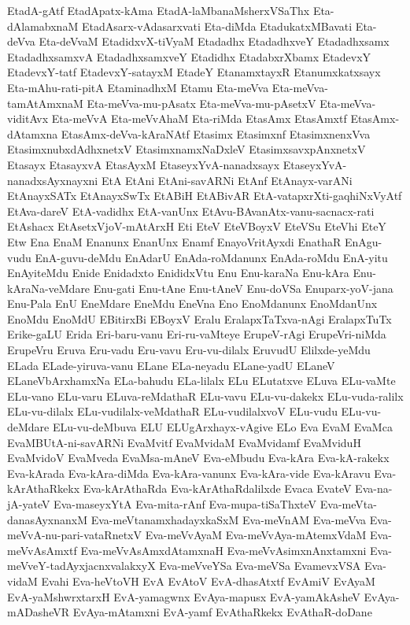 {EtadA-gAtf
EtadApatx-kAma
EtadA-laMbanaMsherxVSaThx
Eta-dAlamabxnaM
EtadAsarx-vAdasarxvati
Eta-diMda
EtadukatxMBavati
Eta-deVva
Eta-deVvaM
EtadidxvX-tiVyaM
Etadadhx
EtadadhxveY
Etadadhxsamx
EtadadhxsamxvA
EtadadhxsamxveY
Etadidhx
EtadabxrXbamx
EtadevxY
EtadevxY-tatf
EtadevxY-satayxM
EtadeY
EtanamxtayxR
Etanumxkatxsayx
Eta-mAhu-rati-pitA
EtaminadhxM
Etamu
Eta-meVva
Eta-meVva-tamAtAmxnaM
Eta-meVva-mu-pAsatx
Eta-meVva-mu-pAsetxV
Eta-meVva-viditAvx
Eta-meVvA
Eta-meVvAhaM
Eta-riMda
EtasAmx
EtasAmxtf
EtasAmx-dAtamxna
EtasAmx-deVva-kAraNAtf
Etasimx
Etasimxnf
EtasimxnenxVva
EtasimxnubxdAdhxnetxV
EtasimxnamxNaDxleV
EtasimxsavxpAnxnetxV
Etasayx
EtasayxvA
EtasAyxM
EtaseyxYvA-nanadxsayx
EtaseyxYvA-nanadxsAyxnayxni
EtA
EtAni
EtAni-savARNi
EtAnf
EtAnayx-varANi
EtAnayxSATx
EtAnayxSwTx
EtABiH
EtABivAR
EtA-vatapxrXti-gaqhiNxVyAtf
EtAva-dareV
EtA-vadidhx
EtA-vanUnx
EtAvu-BAvanAtx-vanu-sacnacx-rati
EtAshacx
EtAsetxVjoV-mAtArxH
Eti
EteV
EteVBoyxV
EteVSu
EteVhi
EteY
Etw
Ena
EnaM
Enanunx
EnanUnx
Enamf
EnayoVritAyxdi
EnathaR
EnAgu-vudu
EnA-guvu-deMdu
EnAdarU
EnAda-roMdanunx
EnAda-roMdu
EnA-yitu
EnAyiteMdu
Enide
Enidadxto
EnididxVtu
Enu
Enu-karaNa
Enu-kAra
Enu-kAraNa-veMdare
Enu-gati
Enu-tAne
Enu-tAneV
Enu-doVSa
Enuparx-yoV-jana
Enu-Pala
EnU
EneMdare
EneMdu
EneVna
Eno
EnoMdanunx
EnoMdanUnx
EnoMdu
EnoMdU
EBitirxBi
EBoyxV
Eralu
EralapxTaTxva-nAgi
EralapxTuTx
Erike-gaLU
Erida
Eri-baru-vanu
Eri-ru-vaMteye
ErupeV-rAgi
ErupeVri-niMda
ErupeVru
Eruva
Eru-vadu
Eru-vavu
Eru-vu-dilalx
EruvudU
Elilxde-yeMdu
ELada
ELade-yiruva-vanu
ELane
ELa-neyadu
ELane-yadU
ELaneV
ELaneVbArxhamxNa
ELa-bahudu
ELa-lilalx
ELu
ELutatxve
ELuva
ELu-vaMte
ELu-vano
ELu-varu
ELuva-reMdathaR
ELu-vavu
ELu-vu-dakekx
ELu-vuda-ralilx
ELu-vu-dilalx
ELu-vudilalx-veMdathaR
ELu-vudilalxvoV
ELu-vudu
ELu-vu-deMdare
ELu-vu-deMbuva
ELU
ELUgArxhayx-vAgive
ELo
Eva
EvaM
EvaMca
EvaMBUtA-ni-savARNi
EvaMvitf
EvaMvidaM
EvaMvidamf
EvaMviduH
EvaMvidoV
EvaMveda
EvaMsa-mAneV
Eva-eMbudu
Eva-kAra
Eva-kA-rakekx
Eva-kArada
Eva-kAra-diMda
Eva-kAra-vanunx
Eva-kAra-vide
Eva-kAravu
Eva-kArAthaRkekx
Eva-kArAthaRda
Eva-kArAthaRdalilxde
Evaca
EvateV
Eva-na-jA-yateV
Eva-maseyxYtA
Eva-mita-rAnf
Eva-mupa-tiSaThxteV
Eva-meVta-danasAyxnanxM
Eva-meVtanamxhadayxkaSxM
Eva-meVnAM
Eva-meVva
Eva-meVvA-nu-pari-vataRnetxV
Eva-meVvAyaM
Eva-meVvAya-mAtemxVdaM
Eva-meVvAsAmxtf
Eva-meVvAsAmxdAtamxnaH
Eva-meVvAsimxnAnxtamxni
Eva-meVveY-tadAyxjacnxvalakxyX
Eva-meVveYSa
Eva-meVSa
EvamevxVSA
Eva-vidaM
Evahi
Eva-heVtoVH
EvA
EvAtoV
EvA-dhasAtxtf
EvAmiV
EvAyaM
EvA-yaMshwrxtarxH
EvA-yamagwnx
EvAya-mapusx
EvA-yamAkAsheV
EvAya-mADasheVR
EvAya-mAtamxni
EvA-yamf
EvAthaRkekx
EvAthaR-doDane
}
